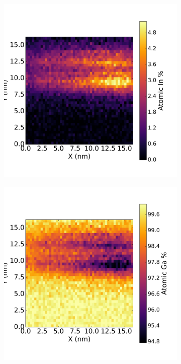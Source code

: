 \begin{figure}
\begin{subfigure}[b]{0.3\textwidth}
	\end{subfigure}%
	\hspace*{0.5cm}
	\begin{subfigure}[b]{0.3\textwidth}
		\centering
		\includegraphics[width=1\linewidth]{Figs/Ch4/AtomicIn}
		\caption{}
		
	\end{subfigure}%
	\hspace*{0.5cm}
	\begin{subfigure}[b]{0.3\textwidth}
		\centering
		\includegraphics[width=1\linewidth]{Figs/Ch4/AtomicGa}
		\caption{}
	\end{subfigure}%
	

\end{figure}

